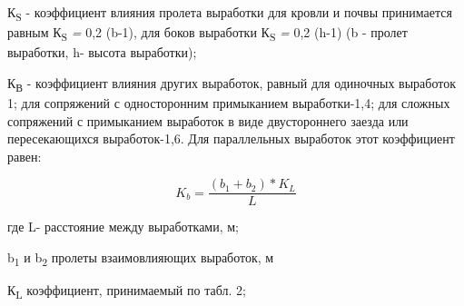\begin{multicols}{2}
К\textsubscript{S} - ко­эффициент влияния пролета выработки для кровли и
почвы принимается равным К\textsubscript{S} \emph{=} 0,2 (b-1), для
боков выработки К\textsubscript{S} \emph{=} 0,2 (h-1) (b - пролет
выработки, h- высота выработки);

К\textsubscript{В} - коэффициент влияния других вы­работок, равный для
одиночных выработок 1; для сопряжений с односторонним примыканием
выработки-1,4; для сложных сопряжений с примыканием выработок в виде
двустороннего заезда или пересекающихся выработок-1,6. Для параллель­ных
выработок этот коэффициент равен:

\begin{equation}
K_{b} = \frac{(b_1+b_2)*K_L}{L}
\end{equation}

где L- расстояние между выработками, м;

b\textsubscript{1} и b\textsubscript{2} пролеты взаимовлияющих
выработок, м

К\textsubscript{L} коэффициент, принимаемый по табл. 2;
\end{multicols}

